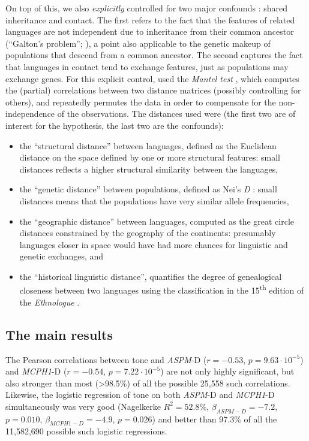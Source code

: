 \documentclass[twoside,onecolumn]{article}
\begin{document}
On top of this, we also \emph{explicitly} controlled for two major confounds \citep{ladd_correlational_2015}: shared inheritance and contact.
The first refers to the fact that the features of related languages are not independent due to inheritance from their common ancestor (``Galton's problem''; \citealp{mace_galtonproblem_1994}), a point also applicable to the genetic makeup of populations that descend from a common ancestor.
The second captures the fact that languages in contact tend to exchange features, just as populations may exchange genes.
For this explicit control, \citet{dediu_ladd_2007} used the \emph{Mantel test} \citep{mantel_detection_1967}, which computes the (partial) correlations between two distance matrices (possibly controlling for others), and repeatedly permutes the data in order to compensate for the non-independence of the observations.
The distances used were (the first two are of interest for the hypothesis, the last two are the confounds):

\begin{itemize}
	\item the ``structural distance'' between languages, defined as the Euclidean distance on the space defined by one or more structural features: small distances reflects a higher structural similarity between the languages,
	\item the ``genetic distance'' between populations, defined as Nei’s \textit{D} \citep{nei_genetic_1972}: small distances means that the populations have very similar allele frequencies,
	\item the ``geographic distance'' between languages, computed as the great circle distances constrained by the geography of the continents: presumably languages closer in space would have had more chances for linguistic and genetic exchanges, and
	\item the ``historical linguistic distance'', quantifies the degree of genealogical closeness between two languages using the classification in the 15\textsuperscript{th} edition of the \textit{Ethnologue} \citep{gordon_ethnologue15_2005}.
\end{itemize}

\subsection{The main results}

The Pearson correlations between tone and \textit{ASPM}-D ($r = -0.53$, $p = 9.63\cdot10^{-5}$) and \textit{MCPH1}-D ($r = -0.54$, $p = 7.22\cdot10^{-5}$) are not only highly significant, but also stronger than most (>98.5\%) of all the possible 25,558 such correlations.
Likewise, the logistic regression of tone on both \textit{ASPM}-D and \textit{MCPH1}-D simultaneously was very good (Nagelkerke $R^2 = 52.8\%$, $\beta_{ASPM-D} = -7.2$, $p = 0.010$, $\beta_{MCPH1-D} = -4.9$, $p = 0.026$) and better than 97.3\% of all the 11,582,690 possible such logistic regressions.
\end{document}
